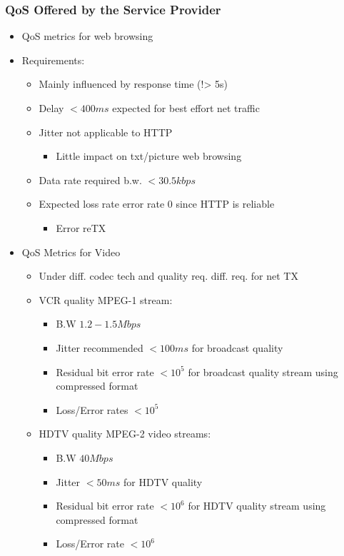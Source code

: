\documentclass[a4paper]{article}
\begin{document}
\subsubsection{QoS Offered by the Service Provider}
\begin{itemize}
	\item QoS metrics for web browsing
	\item Requirements:
	\begin{itemize}
		\item Mainly influenced by response time (!> 5s)
		\item Delay $<400ms$ expected for best effort net traffic
		\item Jitter not applicable to HTTP
		\begin{itemize}
			\item Little impact on txt/picture web browsing
		\end{itemize}
		\item Data rate \amp required b.w. $<30.5kbps$
		\item Expected loss rate \amp error rate 0 since HTTP is
			reliable
		\begin{itemize}
			\item Error reTX
		\end{itemize}
	\end{itemize}
	\item QoS Metrics for Video
	\begin{itemize}
		\item Under diff. codec tech and quality req. diff. req. for net
			TX
		\item VCR quality MPEG-1 stream:
		\begin{itemize}
			\item B.W $1.2-1.5Mbps$
			\item Jitter recommended $<100ms$ for broadcast quality
			\item Residual bit error rate $<10^5$ for broadcast
				quality stream using compressed format
			\item Loss/Error rates $<10^5$
		\end{itemize}
		\item HDTV quality MPEG-2 video streams:
		\begin{itemize}
			\item B.W $40Mbps$
			\item Jitter $<50ms$ for HDTV quality
			\item Residual bit error rate $<10^6$ for HDTV quality
				stream using compressed format
			\item Loss/Error rate $<10^6$

\end{itemize}
\end{itemize}
\end{itemize}
\end{document}
